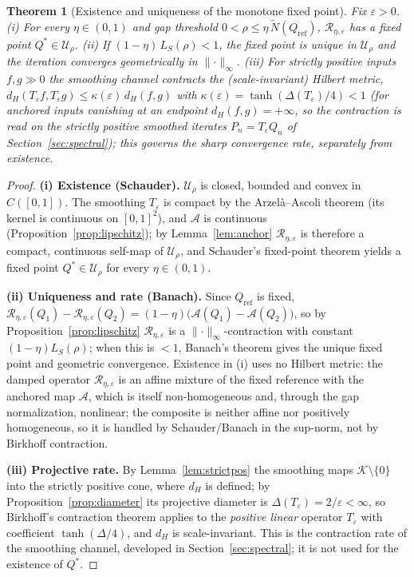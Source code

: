 \documentclass[11pt]{article}
\theoremstyle{plain}
\newtheorem{theorem}{Theorem}[section]
\theoremstyle{definition}
\theoremstyle{remark}
\newcommand{\Rc}{\mathcal R}
\newcommand{\Ac}{\mathcal A}
\begin{document}
\begin{theorem}[Existence and uniqueness of the monotone fixed point]\label{thm:fixedpoint}
Fix $\varepsilon>0$. \emph{(i)} For every $\eta\in(0,1)$ and gap threshold $0<\rho\le\eta\,\tilde N(Q_{\mathrm{ref}})$, $\Rc_{\eta,\varepsilon}$ has a fixed point $Q^*\in\mathcal U_\rho$. \emph{(ii)} If $(1-\eta)\,L_S(\rho)<1$, the fixed point is unique in $\mathcal U_\rho$ and the iteration converges geometrically in $\lVert\cdot\rVert_\infty$. \emph{(iii)} For strictly positive inputs $f,g\gg0$ the smoothing channel contracts the (scale-invariant) Hilbert metric, $d_H(T_\varepsilon f,T_\varepsilon g)\le\kappa(\varepsilon)\,d_H(f,g)$ with $\kappa(\varepsilon)=\tanh(\Delta(T_\varepsilon)/4)<1$ (for anchored inputs vanishing at an endpoint $d_H(f,g)=+\infty$, so the contraction is read on the strictly positive smoothed iterates $P_n=T_\varepsilon Q_n$ of Section~\ref{sec:spectral}); this governs the sharp convergence \emph{rate}, separately from existence.
\end{theorem}
\begin{proof}
\textbf{(i) Existence (Schauder).} $\mathcal U_\rho$ is closed, bounded and convex in $C([0,1])$. The smoothing $T_\varepsilon$ is compact by the Arzel\`a--Ascoli theorem (its kernel is continuous on $[0,1]^2$), and $\Ac$ is continuous (Proposition~\ref{prop:lipschitz}); by Lemma~\ref{lem:anchor} $\Rc_{\eta,\varepsilon}$ is therefore a compact, continuous self-map of $\mathcal U_\rho$, and Schauder's fixed-point theorem \citep{deimling1985} yields a fixed point $Q^*\in\mathcal U_\rho$ for every $\eta\in(0,1)$.

\textbf{(ii) Uniqueness and rate (Banach).} Since $Q_{\mathrm{ref}}$ is fixed, $\Rc_{\eta,\varepsilon}(Q_1)-\Rc_{\eta,\varepsilon}(Q_2)=(1-\eta)\big(\Ac(Q_1)-\Ac(Q_2)\big)$, so by Proposition~\ref{prop:lipschitz} $\Rc_{\eta,\varepsilon}$ is a $\lVert\cdot\rVert_\infty$-contraction with constant $(1-\eta)L_S(\rho)$; when this is $<1$, Banach's theorem \citep{banach1922} gives the unique fixed point and geometric convergence. Existence in (i) uses no Hilbert metric: the damped operator $\Rc_{\eta,\varepsilon}$ is an affine mixture of the fixed reference with the anchored map $\Ac$, which is itself non-homogeneous and, through the gap normalization, nonlinear; the composite is neither affine nor positively homogeneous, so it is handled by Schauder/Banach in the sup-norm, not by Birkhoff contraction.

\textbf{(iii) Projective rate.} By Lemma~\ref{lem:strictpos} the smoothing maps $\mathcal K\setminus\{0\}$ into the strictly positive cone, where $d_H$ is defined; by Proposition~\ref{prop:diameter} its projective diameter is $\Delta(T_\varepsilon)=2/\varepsilon<\infty$, so Birkhoff's contraction theorem \citep{birkhoff1957,bushell1973,evesonnussbaum1995} applies to the \emph{positive linear} operator $T_\varepsilon$ with coefficient $\tanh(\Delta/4)$, and $d_H$ is scale-invariant. This is the contraction rate of the smoothing channel, developed in Section~\ref{sec:spectral}; it is not used for the existence of $Q^*$.
\end{proof}
\end{document}
